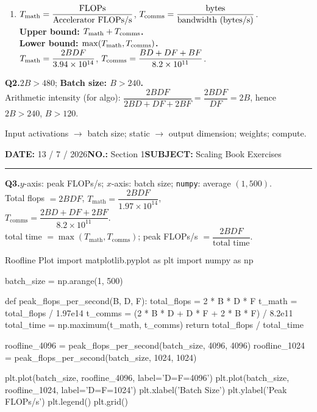 \documentclass[10pt]{article}
\newcommand{\answer}[1]{\textcolor{blue!65!black}{\textbf{#1}}}
\newcommand{\question}[1]{\par\vspace{0.9em}\noindent\textbf{#1}\quad}
\newcommand{\meta}[2]{\textbf{#1} #2\hspace{2.5em}}
\newcommand{\pagehead}[2]{%
 {\small\meta{DATE:}{#1}\meta{NO.:}{#2}\meta{SUBJECT:}{Scaling Book Exercises}}\par\vspace{0.8em}\hrule\vspace{0.8em}}
\begin{document}
\begin{enumerate}[label=\arabic*.,leftmargin=1.4em,start=4]
\item $T_{\rm math}=\dfrac{\text{FLOPs}}{\text{Accelerator FLOPs/s}}$, \quad $T_{\rm comms}=\dfrac{\text{bytes}}{\text{bandwidth (bytes/s)}}$.\\
\answer{Upper bound: $T_{\rm math}+T_{\rm comms}$.}\\
\answer{Lower bound: $\max(T_{\rm math},T_{\rm comms})$.}\\
$T_{\rm math}=\dfrac{2BDF}{3.94\times10^{14}}$, \quad $T_{\rm comms}=\dfrac{BD+DF+BF}{8.2\times10^{11}}$.
\end{enumerate}

\question{Q2.}$2B>480$; \answer{Batch size: $B>240$.}\\
Arithmetic intensity (for algo): $\dfrac{2BDF}{2BD+DF+2BF}=\dfrac{2BDF}{DF}=2B$, hence $2B>240$, $B>120$.

\begin{center}\end{center}
\small Input activations $\rightarrow$ batch size; static $\rightarrow$ output dimension; weights; compute.\normalsize

\newpage
\pagehead{13 / 7 / 2026}{Section 1}
\question{Q3.}$y$-axis: peak FLOPs/s; $x$-axis: batch size; \quad \texttt{numpy}: average $(1,500)$.\\
Total flops $=2BDF$, \quad $T_{\mathrm{math}}=\dfrac{2BDF}{1.97\times10^{14}}$,\\
$T_{\mathrm{comms}}=\dfrac{2BD+DF+2BF}{8.2\times10^{11}}$.\\
total time $=\max(T_{\mathrm{math}},T_{\mathrm{comms}})$; peak FLOPs/s $=\dfrac{2BDF}{\text{total time}}$.

\vspace{1em}
\begin{pythonblock}{Roofline Plot}
import matplotlib.pyplot as plt
import numpy as np

batch_size = np.arange(1, 500)

def peak_flops_per_second(B, D, F):
    total_flops = 2 * B * D * F
    t_math = total_flops / 1.97e14
    t_comms = (2 * B * D + D * F + 2 * B * F) / 8.2e11
    total_time = np.maximum(t_math, t_comms)
    return total_flops / total_time

roofline_4096 = peak_flops_per_second(batch_size, 4096, 4096)
roofline_1024 = peak_flops_per_second(batch_size, 1024, 1024)

plt.plot(batch_size, roofline_4096, label='D=F=4096')
plt.plot(batch_size, roofline_1024, label='D=F=1024')
plt.xlabel('Batch Size')
plt.ylabel('Peak FLOPs/s')
plt.legend()
plt.grid()
\end{pythonblock}
\end{document}
